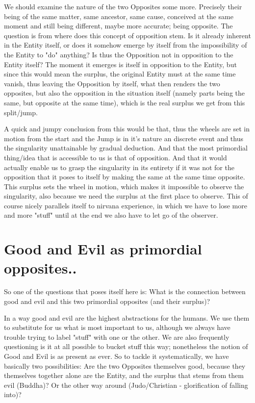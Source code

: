 \documentclass[10pt]{book}
\begin{document}
We should examine the nature of the two Opposites some more. Precisely their being of the same matter, same ancestor, same cause, conceived at the same moment and still being different, maybe more accurate; being opposite. The question is from where does this concept of opposition stem. Is it already inherent in the Entity itself, or does it somehow emerge by itself from the impossibility of the Entity to "do" anything? Is thus the Opposition not in opposition to the Entity itself? The moment it emerges is itself in opposition to the Entity, but since this would mean the surplus, the original Entity must at the same time vanish, thus leaving the Opposition by itself, what then renders the two opposites, but also the opposition in the situation itself (namely parts being the same, but opposite at the same time), which is the real surplus we get from this split/jump. 

A quick and jumpy conclusion from this would be that, thus the wheels are set in motion from the start and the Jump is in it's nature an discrete event and thus the singularity unattainable by gradual deduction. And that the most primordial thing/idea that is accessible to us is that of opposition. And that it would actually enable us to grasp the singularity in its entirety if it was not for the opposition that it poses to itself by making the same at the same time opposite. This surplus sets the wheel in motion, which makes it impossible to observe the singularity, also because we need the surplus at the first place to observe. This of course nicely parallels itself to nirvana experience, in which we have to lose more and more "stuff" until at the end we also have to let go of the observer.

\section{Good and Evil as primordial opposites..}

So one of the questions that poses itself here is: What is the connection between good and evil and this two primordial opposites (and their surplus)?

In a way good and evil are the highest abstractions for the humans. We use them to substitute for us what is most important to us, although we always have trouble trying to label "stuff" with one or the other. We are also frequently questioning is it at all possible to bucket stuff this way; nonetheless the notion of Good and Evil is as present as ever. So to tackle it systematically, we have basically two possibilities: Are the two Opposites themselves good, because they themselves together alone are the Entity, and the surplus that stems from them evil (Buddha)? Or the other way around (Judo/Christian - glorification of falling into)?
\end{document}
